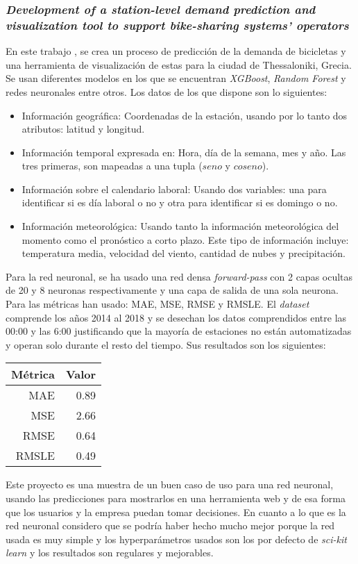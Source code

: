 \subsubsection{\textit{Development of a station-level demand prediction and visualization tool to support bike-sharing systems’ operators}}

En este trabajo \cite{BOUFIDIS202051}, se crea un proceso de predicción de la demanda de bicicletas y una herramienta de visualización de estas para la ciudad de Thessaloniki, Grecia. Se usan diferentes modelos en los que se encuentran \textit{XGBoost}, \textit{Random Forest} y redes neuronales entre otros. Los datos de los que dispone son lo siguientes:
\begin{itemize}
    \item Información geográfica: Coordenadas de la estación, usando por lo tanto dos atributos: latitud y longitud.
    \item Información temporal expresada en: Hora, día de la semana, mes y año. Las tres primeras, son mapeadas a una tupla ($seno$ y $coseno$).
    \item Información sobre el calendario laboral: Usando dos variables: una para identificar si es día laboral o no y otra para identificar si es domingo o no.
    \item Información meteorológica: Usando tanto la información meteorológica del momento como el pronóstico a corto plazo. Este tipo de información incluye: temperatura media, velocidad del viento, cantidad de nubes y precipitación.
\end{itemize}

Para la red neuronal, se ha usado una red densa \textit{forward-pass} con 2 capas ocultas de 20 y 8 neuronas respectivamente y una capa de salida de una sola neurona. Para las métricas han usado: MAE, MSE, RMSE y RMSLE. El \textit{dataset} comprende los años 2014 al 2018 y se desechan los datos comprendidos entre las 00:00 y las 6:00 justificando que la mayoría de estaciones no están automatizadas y operan solo durante el resto del tiempo. Sus resultados son los siguientes:


 
\begin{table}[H]
\centering
\begin{tabular}{rr}
\toprule
 Métrica & Valor \\
\midrule
 MAE &  0.89 \\
 MSE &  2.66 \\
 RMSE &  0.64 \\
 RMSLE &  0.49 \\
\bottomrule
\end{tabular}
\end{table}

Este proyecto es una muestra de un buen caso de uso para una red neuronal, usando las predicciones para mostrarlos en una herramienta web y de esa forma que los usuarios y la empresa puedan tomar decisiones. En cuanto a lo que es la red neuronal considero que se podría haber hecho mucho mejor porque la red usada es muy simple y los hyperparámetros usados son los por defecto de \textit{sci-kit learn} y los resultados son regulares y mejorables.